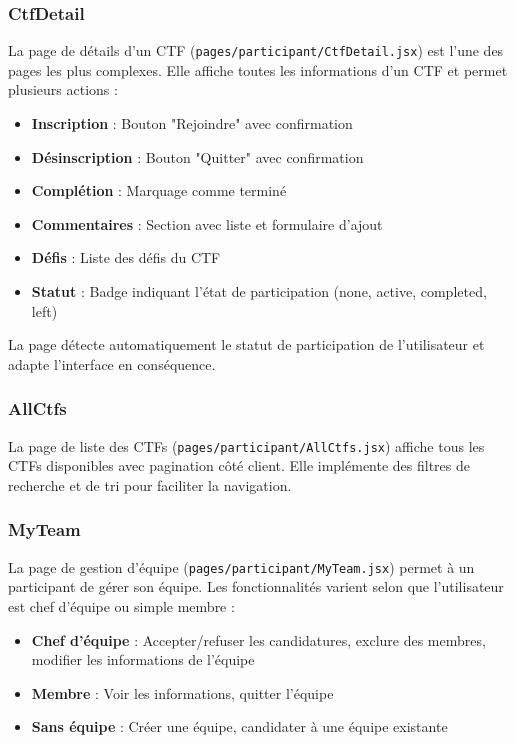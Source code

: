 \subsubsection{CtfDetail}

La page de détails d'un CTF (\texttt{pages/participant/CtfDetail.jsx}) est l'une des pages les plus complexes. Elle affiche toutes les informations d'un CTF et permet plusieurs actions :

\begin{itemize}
    \item \textbf{Inscription} : Bouton "Rejoindre" avec confirmation
    \item \textbf{Désinscription} : Bouton "Quitter" avec confirmation
    \item \textbf{Complétion} : Marquage comme terminé
    \item \textbf{Commentaires} : Section avec liste et formulaire d'ajout
    \item \textbf{Défis} : Liste des défis du CTF
    \item \textbf{Statut} : Badge indiquant l'état de participation (none, active, completed, left)
\end{itemize}

La page détecte automatiquement le statut de participation de l'utilisateur et adapte l'interface en conséquence.

\subsubsection{AllCtfs}

La page de liste des CTFs (\texttt{pages/participant/AllCtfs.jsx}) affiche tous les CTFs disponibles avec pagination côté client. Elle implémente des filtres de recherche et de tri pour faciliter la navigation.

\subsubsection{MyTeam}

La page de gestion d'équipe (\texttt{pages/participant/MyTeam.jsx}) permet à un participant de gérer son équipe. Les fonctionnalités varient selon que l'utilisateur est chef d'équipe ou simple membre :

\begin{itemize}
    \item \textbf{Chef d'équipe} : Accepter/refuser les candidatures, exclure des membres, modifier les informations de l'équipe
    \item \textbf{Membre} : Voir les informations, quitter l'équipe
    \item \textbf{Sans équipe} : Créer une équipe, candidater à une équipe existante
\end{itemize}


